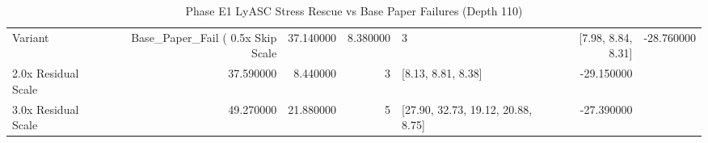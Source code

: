 \begin{table}
\caption{Phase E1 LyASC Stress Rescue vs Base Paper Failures (Depth 110)}
\label{tab:stress_rescue}
\begin{tabular}{lrrrlr}
\toprule
Variant & Base_Paper_Fail (%
\midrule
0.5x Skip Scale & 37.140000 & 8.380000 & 3 & [7.98, 8.84, 8.31] & -28.760000 \\
2.0x Residual Scale & 37.590000 & 8.440000 & 3 & [8.13, 8.81, 8.38] & -29.150000 \\
3.0x Residual Scale & 49.270000 & 21.880000 & 5 & [27.90, 32.73, 19.12, 20.88, 8.75] & -27.390000 \\
\bottomrule
\end{tabular}
\end{table}
